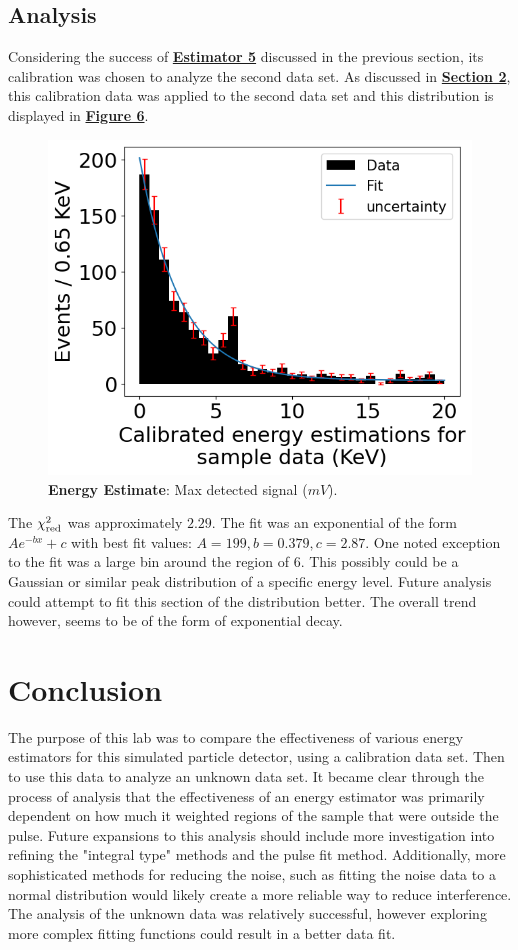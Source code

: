 \documentclass[
	letterpaper, %
	10pt, %
]{template}
\begin{document}
\subsection{Analysis}
Considering the success of \textbf{\hyperref[est-5]{Estimator 5}} discussed in the previous section, its calibration was chosen to analyze the second data set. As discussed in \textbf{\hyperref[sec::method]{Section 2}}, this calibration data was applied to the second data set and this distribution is displayed in \textbf{\hyperref[fig::6]{Figure 6}}.
\begin{figure}[H]
\centering
\includegraphics[width=.45\textwidth]{figures/signalAnalysis--calibrated.png}
\caption{\textbf{Energy Estimate}: Max detected signal ($\unit{mV}$).~\label{fig::6}}
\end{figure}
The $\chi_{\rm red}^2$ was approximately $2.29$. The fit was an exponential of the form $Ae^{-bx} + c$ with best fit values: $A=199, b =0.379, c = 2.87$. One noted exception to the fit was a large bin around the region of 6. This possibly could be a Gaussian or similar peak distribution of a specific energy level. Future analysis could attempt to fit this section of the distribution better. The overall trend however, seems to be of the form of exponential decay.
\section{Conclusion}
The purpose of this lab was to compare the effectiveness of various energy estimators for this simulated particle detector, using a calibration data set. Then to use this data to analyze an unknown data set. It became clear through the process of analysis that the effectiveness of an energy estimator was primarily dependent on how much it weighted regions of the sample that were outside the pulse. Future expansions to this analysis should include more investigation into refining the "integral type" methods and the pulse fit method. Additionally, more sophisticated methods for reducing the noise, such as fitting the noise data to a normal distribution would likely create a more reliable way to reduce interference. The analysis of the unknown data was relatively successful, however exploring more complex fitting functions could result in a better data fit.
\newpage\appendix{}

\newpage
\end{document}
